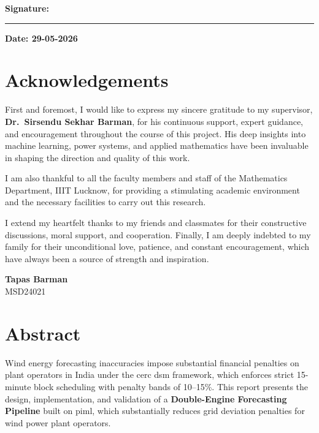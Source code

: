 \documentclass[12pt,a4paper]{report}
\begin{document}
\vspace{2cm}
\noindent\textbf{Signature:}\\[1cm]
\rule{4.5cm}{0.4pt}
\vspace{1cm}

\noindent\textbf{Date: 29-05-2026}

\chapter*{Acknowledgements}

First and foremost, I would like to express my sincere gratitude to my supervisor,
\textbf{Dr.\ Sirsendu Sekhar Barman}, for his continuous support, expert guidance, and
encouragement throughout the course of this project. His deep insights into machine learning,
power systems, and applied mathematics have been invaluable in shaping the direction and
quality of this work.

I am also thankful to all the faculty members and staff of the Mathematics Department,
IIIT Lucknow, for providing a stimulating academic environment and the necessary facilities
to carry out this research.

I extend my heartfelt thanks to my friends and classmates for their constructive discussions,
moral support, and cooperation. Finally, I am deeply indebted to my family for their
unconditional love, patience, and constant encouragement, which have always been a source
of strength and inspiration.

\vspace{1.5cm}
\begin{flushright}
  \textbf{Tapas Barman}\\
  MSD24021
\end{flushright}

\chapter*{Abstract}
\onehalfspacing

Wind energy forecasting inaccuracies impose substantial financial penalties on plant operators
in India under the \gls{cerc} \gls{dsm} framework, which enforces strict 15-minute block
scheduling with penalty bands of 10--15\%. This report presents the design, implementation,
and validation of a \textbf{Double-Engine Forecasting Pipeline} built on \gls{piml}, which
substantially reduces grid deviation penalties for wind power plant operators.
\end{document}
